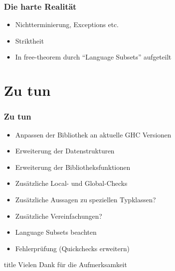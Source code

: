\documentclass{beamer}
\begin{document}
\begin{frame}
\frametitle{Die harte Realität}

\begin{itemize}
\item Nichtterminierung, Exceptions etc.
\item Striktheit
\item In free-theorem durch ``Language Subsets'' aufgeteilt
\end{itemize}

\end{frame}

\section{Zu tun}

\begin{frame}
\frametitle{Zu tun}

\begin{itemize}
\item Anpassen der Bibliothek an aktuelle GHC Versionen
\item Erweiterung der Datenstrukturen
\item Erweiterung der Bibliotheksfunktionen
\item Zusätzliche Local- und Global-Checks
\item Zusätzliche Aussagen zu speziellen Typklassen?
\item Zusätzliche Vereinfachungen?
\item Language Subsets beachten
\item Fehlerprüfung (Quickchecks erweitern)
\end{itemize}

\end{frame}

  \begin{frame}
  \vfill
  \centering
  \begin{beamercolorbox}[sep=8pt,center,shadow=true,rounded=true]{title}
    Vielen Dank für die Aufmerksamkeit\par%
  \end{beamercolorbox}
  \vfill
  \end{frame}
\end{document}
